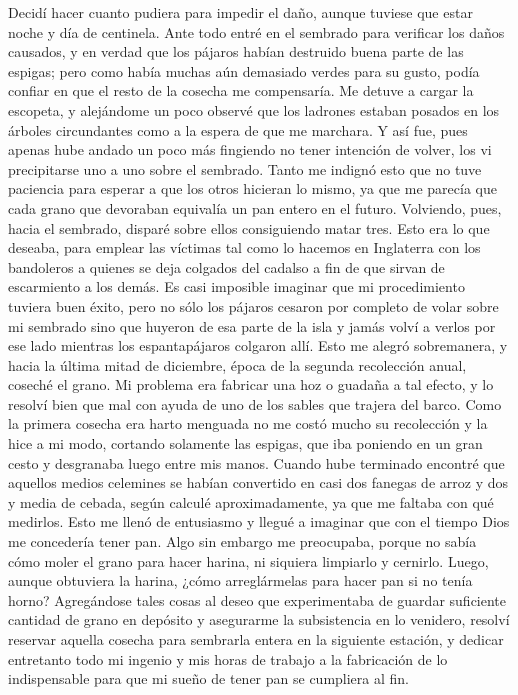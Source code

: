 \documentclass{novela}
\begin{document}
    Decidí hacer cuanto pudiera para impedir el daño, aunque tuviese que estar noche y día de centinela. Ante todo entré en el sembrado para verificar los daños causados, y en verdad que los pájaros habían destruido buena parte de las espigas; pero como había muchas aún demasiado verdes para su gusto, podía confiar en que el resto de la cosecha me compensaría.
    Me detuve a cargar la escopeta, y alejándome un poco observé que los ladrones estaban posados en los árboles circundantes como a la espera de que me marchara. Y así fue, pues apenas hube andado un poco más fingiendo no tener intención de volver, los vi precipitarse uno a uno sobre el sembrado. Tanto me indignó esto que no tuve paciencia para esperar a que los otros hicieran lo mismo, ya que me parecía que cada grano que devoraban equivalía un pan entero en el futuro. Volviendo, pues, hacia el sembrado, disparé sobre ellos consiguiendo matar tres. Esto era lo que deseaba, para emplear las víctimas tal como lo hacemos en Inglaterra con los bandoleros a quienes se deja colgados del cadalso a fin de que sirvan de escarmiento a los demás.
    Es casi imposible imaginar que mi procedimiento tuviera buen éxito, pero no sólo los pájaros cesaron por completo de volar sobre mi sembrado sino que huyeron de esa parte de la isla y jamás volví a verlos por ese lado mientras los espantapájaros colgaron allí.
    Esto me alegró sobremanera, y hacia la última mitad de diciembre, época de la segunda recolección anual, coseché el grano.
    Mi problema era fabricar una hoz o guadaña a tal efecto, y lo resolví bien que mal con ayuda de uno de los sables que trajera del barco. Como la primera cosecha era harto menguada no me costó mucho su recolección y la hice a mi modo, cortando solamente las espigas, que iba poniendo en un gran cesto y desgranaba luego entre mis manos. Cuando hube terminado encontré que aquellos medios celemines se habían convertido en casi dos fanegas de arroz y dos y media de cebada, según calculé aproximadamente, ya que me faltaba con qué medirlos.
    Esto me llenó de entusiasmo y llegué a imaginar que con el tiempo Dios me concedería tener pan. Algo sin embargo me preocupaba, porque no sabía cómo moler el grano para hacer harina, ni siquiera limpiarlo y cernirlo. Luego, aunque obtuviera la harina, ¿cómo arreglármelas para hacer pan si no tenía horno? Agregándose tales cosas al deseo que experimentaba de guardar suficiente cantidad de grano en depósito y asegurarme la subsistencia en lo venidero, resolví reservar aquella cosecha para sembrarla entera en la siguiente estación, y dedicar entretanto todo mi ingenio y mis horas de trabajo a la fabricación de lo indispensable para que mi sueño de tener pan se cumpliera al fin.
\end{document}
